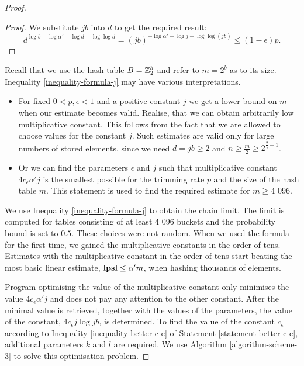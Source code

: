 \begin{proof}
\begin{proof}
We substitute $j b$ into $d$ to get the required result:
\[
	d ^ {\log b - \log \alpha' - \log d - \log \log d} = \left(j b\right)^{-\log \alpha' -\log j - \log \log (j b)} \leq (1 - \epsilon)p \text{.}
\]
\end{proof}

Recall that we use the hash table $B = \mathbb{Z}_{2}^{b}$ and refer to $m = 2 ^ b$ as to its size. Inequality \ref{inequality-formula-j} may have various interpretations.
\begin{itemize}
\item For fixed $0 < p, \epsilon < 1$ and a positive constant $j$ we get a lower bound on $m$ when our estimate becomes valid. Realise, that we can obtain arbitrarily low multiplicative constant. This follows from the fact that we are allowed to choose values for the constant $j$. Such estimates are valid only for large numbers of stored elements, since we need $d = jb \geq 2$ and $n \geq \frac{m}{2} \geq 2 ^ {\frac{2}{j} - 1}$.
\item Or we can find the parameters $\epsilon$ and $j$ such that multiplicative constant $4 c_\epsilon \alpha' j$ is the smallest possible for the trimming rate $p$ and the size of the hash table $m$. This statement is used to find the required estimate for $m \geq \text{4 096}$.
\end{itemize}

We use Inequality \ref{inequality-formula-j} to obtain the chain limit. The limit is computed for tables consisting of at least 4 096 buckets and the probability bound is set to $0.5$. These choices were not random. When we used the formula for the first time, we gained the multiplicative constants in the order of tens. Estimates with the multiplicative constant in the order of tens start beating the most basic linear estimate, $\mathbf{lpsl} \leq \alpha' m$, when hashing thousands of elements.

Program optimising the value of the multiplicative constant only minimises the value $4 c_\epsilon \alpha' j$ and does not pay any attention to the other constant. After the minimal value is retrieved, together with the values of the parameters, the value of the constant, $4 c_\epsilon j \log j b$, is determined. To find the value of the constant $c_\epsilon$ according to Inequality \ref{inequality-better-c-e} of Statement \ref{statement-better-c-e}, additional parameters $k$ and $l$ are required. We use Algorithm \ref{algorithm-scheme-3} to solve this optimisation problem.


\end{proof}
